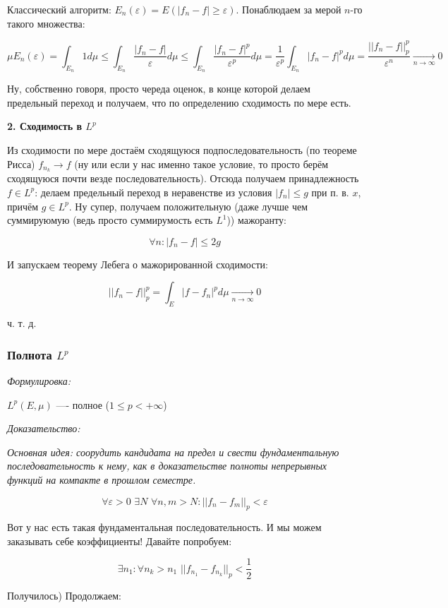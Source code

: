 \documentclass{article}
\def\dbl{\,\,}
\def\goesto#1{\underset{#1}{\longrightarrow}}
\def\toinf#1{\goesto{#1 \rightarrow \infty}}
\def\ntoinf{\toinf{n}}
\begin{document}
Классический алгоритм: $E_n(\varepsilon) = E(|f_n - f| \ge \varepsilon)$. Понаблюдаем за мерой $n$-го такого множества:

\[\mu E_n(\varepsilon) = \int_{E_n} 1 d\mu \le \int_{E_n} \frac{|f_n - f|}{\varepsilon} d\mu \le \int_{E_n} \frac{|f_n - f|^p}{\varepsilon^p} d\mu = \frac{1}{\varepsilon^p} \int_{E_n} |f_n - f|^p d\mu = \frac{||f_n - f||_p^p}{\varepsilon^n} \ntoinf 0\]

Ну, собственно говоря, просто череда оценок, в конце которой делаем предельный переход и получаем, что по определению сходимость по мере есть.

\textbf{2. Сходимость в $L^p$}

Из сходимости по мере достаём сходящуюся подпоследовательность (по теореме Рисса) $f_{n_k} \rightarrow f$ (ну или если у нас именно такое условие, то просто берём сходящуюся почти везде последовательность). Отсюда получаем принадлежность $f \in L^p$: делаем предельный переход в неравенстве из условия $|f_n| \le g$ при п. в. $x$, причём $g \in L^p$. Ну супер, получаем положительную (даже лучше чем суммируюмую (ведь просто суммирумость есть $L^1$)) мажоранту:

\[\forall n: |f_n - f| \le 2g\]

И запускаем теорему Лебега о мажорированной сходимости:

\[||f_n - f||_p^p = \int_{E} |f - f_n|^p d\mu \ntoinf 0 \]

ч. т. д. 

\subsubsection{Полнота $L^p$}
\textit{Формулировка:}

$L^p(E, \mu)$ ---- полное ($1 \le p < + \infty$)

\textit{Доказательство:}

\textit{Основная идея: соорудить кандидата на предел и свести фундаментальную последовательность к нему, как в доказательстве полноты непрерывных функций на компакте в прошлом семестре.}

\[\forall \varepsilon > 0 \dbl \exists N \dbl \forall n, m > N: ||f_n - f_m||_p < \varepsilon\]

Вот у нас есть такая фундаментальная последовательность. И мы можем заказывать себе коэффициенты! Давайте попробуем:

\[\exists n_1: \forall n_k > n_1 \dbl ||f_{n_1} - f_{n_k}||_p < \frac{1}{2}\]

Получилось) Продолжаем:
\end{document}
